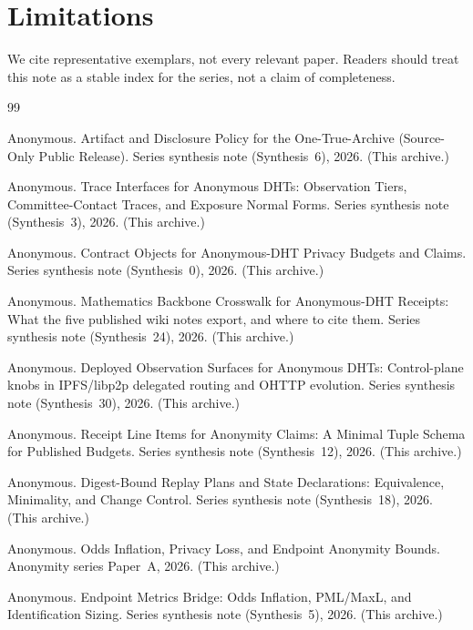 \documentclass[11pt]{article}
\begin{document}
\section{Limitations}
We cite representative exemplars, not every relevant paper.
Readers should treat this note as a stable index for the series, not a claim of completeness.

\begin{thebibliography}{99}\small

Anonymous.
\newblock Artifact and Disclosure Policy for the One-True-Archive (Source-Only Public Release).
\newblock Series synthesis note (Synthesis~6), 2026. (This archive.)

Anonymous.
\newblock Trace Interfaces for Anonymous DHTs: Observation Tiers, Committee-Contact Traces, and Exposure Normal Forms.
\newblock Series synthesis note (Synthesis~3), 2026. (This archive.)

Anonymous.
\newblock Contract Objects for Anonymous-DHT Privacy Budgets and Claims.
\newblock Series synthesis note (Synthesis~0), 2026. (This archive.)


Anonymous.
\newblock Mathematics Backbone Crosswalk for Anonymous-DHT Receipts: What the five published wiki notes export, and where to cite them.
\newblock Series synthesis note (Synthesis~24), 2026. (This archive.)

Anonymous.
\newblock Deployed Observation Surfaces for Anonymous DHTs: Control-plane knobs in IPFS/libp2p delegated routing and OHTTP evolution.
\newblock Series synthesis note (Synthesis~30), 2026. (This archive.)

Anonymous.
\newblock Receipt Line Items for Anonymity Claims: A Minimal Tuple Schema for Published Budgets.
\newblock Series synthesis note (Synthesis~12), 2026. (This archive.)

Anonymous.
\newblock Digest-Bound Replay Plans and State Declarations: Equivalence, Minimality, and Change Control.
\newblock Series synthesis note (Synthesis~18), 2026. (This archive.)

Anonymous.
\newblock Odds Inflation, Privacy Loss, and Endpoint Anonymity Bounds.
\newblock Anonymity series Paper~A, 2026. (This archive.)

Anonymous.
\newblock Endpoint Metrics Bridge: Odds Inflation, PML/MaxL, and Identification Sizing.
\newblock Series synthesis note (Synthesis~5), 2026. (This archive.)


\end{thebibliography}
\end{document}
